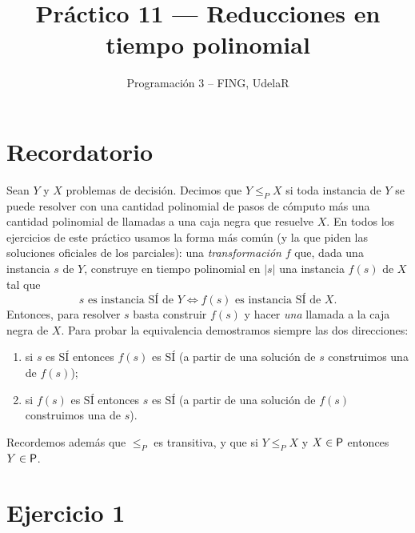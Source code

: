 
\setlength{\emergencystretch}{2em}

\newcommand{\IS}{\textsc{Independent Set}}
\newcommand{\VC}{\textsc{Vertex Cover}}
\newcommand{\DS}{\textsc{Dominating Set}}
\newcommand{\Cl}{\textsc{Clique}}
\newcommand{\IntS}{\textsc{Interval Scheduling}}
\newcommand{\leP}{\le_P}
\newcommand{\SI}{S\'I}

\title{Práctico 11 --- Reducciones en tiempo polinomial}
\author{Programación 3 -- FING, UdelaR}
\date{}


\maketitle

\section*{Recordatorio}

Sean $Y$ y $X$ problemas de decisión. Decimos que $Y \leP X$ si toda instancia de $Y$ se puede resolver
con una cantidad polinomial de pasos de cómputo más una cantidad polinomial de llamadas a una caja negra
que resuelve $X$. En todos los ejercicios de este práctico usamos la forma más común (y la que piden las
soluciones oficiales de los parciales): una \emph{transformación} $f$ que, dada una instancia $s$ de $Y$,
construye en tiempo polinomial en $|s|$ una instancia $f(s)$ de $X$ tal que
\[
  s \text{ es instancia \SI{} de } Y \iff f(s) \text{ es instancia \SI{} de } X .
\]
Entonces, para resolver $s$ basta construir $f(s)$ y hacer \emph{una} llamada a la caja negra de $X$.
Para probar la equivalencia demostramos siempre las dos direcciones:
\begin{enumerate}[label=(\roman*)]
  \item si $s$ es \SI{} entonces $f(s)$ es \SI{} (a partir de una solución de $s$ construimos una de $f(s)$);
  \item si $f(s)$ es \SI{} entonces $s$ es \SI{} (a partir de una solución de $f(s)$ construimos una de $s$).
\end{enumerate}
Recordemos además que $\leP$ es transitiva, y que si $Y \leP X$ y $X \in \mathsf{P}$ entonces $Y \in \mathsf{P}$.

\section{Ejercicio 1}

